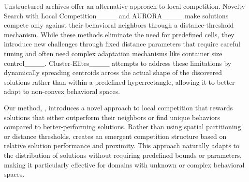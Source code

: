 Unstructured archives offer an alternative approach to local competition. Novelty Search with Local Competition____ and AURORA____ make solutions compete only against their behavioral neighbors through a distance-threshold mechanism. While these methods eliminate the need for predefined cells, they introduce new challenges through fixed distance parameters that require careful tuning and often need complex adaptation mechanisms like container size control____. Cluster-Elites____ attempts to address these limitations by dynamically spreading centroids across the actual shape of the discovered solutions rather than within a predefined hyperrectangle, allowing it to better adapt to non-convex behavioral spaces.

Our method, \ours{}, introduces a novel approach to local competition that rewards solutions that either outperform their neighbors or find unique behaviors compared to better-performing solutions. Rather than using spatial partitioning or distance thresholds, \ours{} creates an emergent competition structure based on relative solution performance and proximity. This approach naturally adapts to the distribution of solutions without requiring predefined bounds or parameters, making it particularly effective for domains with unknown or complex behavioral spaces.